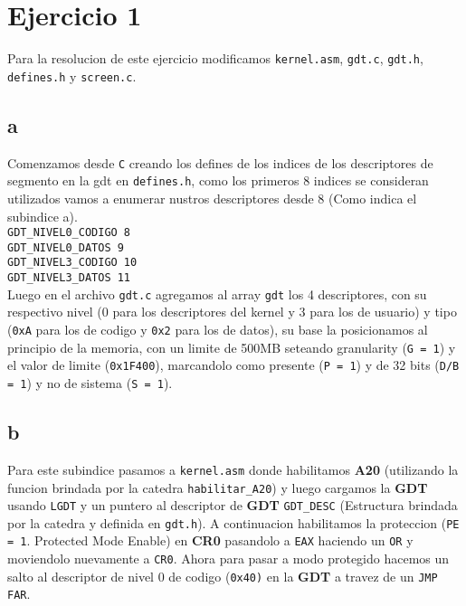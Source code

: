 \section{Ejercicio 1}

Para la resolucion de este ejercicio modificamos \texttt{kernel.asm}, \texttt{gdt.c}, \texttt{gdt.h}, \texttt{defines.h} y \texttt{screen.c}.

\subsection{a}
Comenzamos desde \texttt{C} creando los defines de los indices de los descriptores de segmento en la gdt en \texttt{defines.h}, como los primeros 8 indices se consideran utilizados vamos a enumerar nustros descriptores desde 8 (Como indica el subindice a). \\
\texttt{GDT\_NIVEL0\_CODIGO   8} \\
\texttt{GDT\_NIVEL0\_DATOS    9} \\
\texttt{GDT\_NIVEL3\_CODIGO   10} \\
\texttt{GDT\_NIVEL3\_DATOS    11} \\

Luego en el archivo \texttt{gdt.c} agregamos al array \texttt{gdt} los 4 descriptores, con su respectivo nivel (0 para los descriptores del kernel y 3 para los de usuario) y tipo (\texttt{0xA} para los de codigo y \texttt{0x2} para los de datos), su base la posicionamos al principio de la memoria, con un limite de 500MB seteando granularity (\texttt{G = 1}) y el valor de limite (\texttt{0x1F400}), marcandolo como presente (\texttt{P = 1}) y de 32 bits (\texttt{D/B = 1}) y no de sistema (\texttt{S = 1}).

\subsection{b}
Para este subindice pasamos a \texttt{kernel.asm} donde habilitamos \textbf{A20} (utilizando la funcion brindada por la catedra \texttt{habilitar\_A20}) y luego cargamos la \textbf{GDT} usando \texttt{LGDT} y un puntero al descriptor de \textbf{GDT} \texttt{GDT\_DESC} (Estructura brindada por la catedra y definida en \texttt{gdt.h}). A continuacion habilitamos la proteccion (\texttt{PE = 1}. Protected Mode Enable) en \textbf{CR0} pasandolo a \texttt{EAX} haciendo un \texttt{OR} y moviendolo nuevamente a \texttt{CR0}. Ahora para pasar a modo protegido hacemos un salto al descriptor de nivel 0 de codigo (\texttt{0x40)} en la \textbf{GDT} a travez de un \texttt{JMP FAR}. \\

